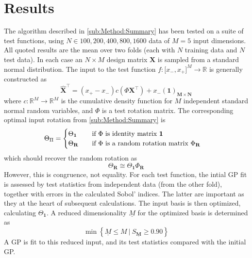 \documentclass[preprint,12pt]{elsarticle}
\newcommand*{\M}[1]{\ensuremath{#1}\xspace}
\newcommand*{\vr}[1]{\M{\mathbf{#1}}}
\newcommand*{\st}[1]{\M{\mathbb{#1}}}
\newcommand{\T}[1]{\text{#1}}
\newcommand*{\QT}[2][]{\M{\quad\T{#2}\ifthenelse{\equal{#1}{}}{\quad}{#1}}}
\newcommand*{\setbuilder}[2]{\M{\left\lbrace#1 \: \big\vert \: #2\right\rbrace}}
\begin{document}
    \section{Results} \label{sec:Results}
        The algorithm described in \cref{sub:Method:Summary} has been tested on a suite of test functions, using $N \in {100, 200, 400, 800, 1600}$ data of $M=5$ input dimensions. All quoted results are the mean over two folds (each with $N$ training data and $N$ test data).
        In each case an \M{N \times M} design matrix \vr{X} is sampled from a standard normal distribution. 
        The input to the test function \M{f\colon \lbrack x_-, x_+ \rbrack^{M} \to \st{R}} is generally constructed as
        \begin{equation} \label{def:Xhat}
            \vr{\hat{X}}^{\intercal} = (x_+ - x_-) c(\Phi \vr{X}^{\intercal}) + x_-(\vr{1})_{\vr{M} \times \vr{N}}
        \end{equation}
        where \M{c\colon \st{R}^M\to\st{R}^M} is the cumulative density function for \M{M} independent standard normal random variables, and \M{\Phi} is a test rotation matrix. 
        The corresponding optimal input rotation from \cref{sub:Method:Summary} is
        \begin{equation}
            \Theta_{\Pi} = \begin{cases}
                \Theta_{\vr{1}} & \QT{if \M{\Phi} is identity matrix \M{\vr{1}}} \\
                \Theta_{\vr{R}} & \QT{if \M{\Phi} is a random rotation matrix \M{\Phi_{\vr{R}}}}
            \end{cases}
        \end{equation}
        which should recover the random rotation as
        \begin{equation}
            \Theta_{\vr{R}} \cong \Theta_{\vr{1}} \Phi_{\vr{R}}
        \end{equation}
        However, this is congruence, not equality.
        For each test function, the intial GP fit is assessed by test statistics from independent data (from the other fold), together with errors in the calculated Sobol' indices. The latter are important as they at the heart of subsequent calculations. The input basis is then optimized, calculating $\Theta_{\vr{1}}$.
        A reduced dimensionality \M{\underline{M}} for the optimized basis is determined as 
        \begin{equation} \label{eq:Results:Mbar}
            \min \setbuilder{\underline{M} \leq M}{S_{\underline{\vr{M}}} \geq 0.90}
        \end{equation}
        A GP is fit to this reduced input, and its test statistics compared with the initial GP.
\end{document}

